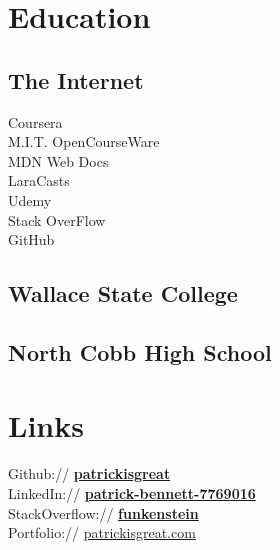 \documentclass[]{pb-resume-openfonts}
\begin{document}
%
%
\lastupdated

%
%

%
%

\begin{minipage}[t]{0.33\textwidth} 


\section{Education} 

\subsection{The Internet}
Coursera \\
M.I.T. OpenCourseWare \\
MDN Web Docs \\
LaraCasts \\
Udemy \\
Stack OverFlow \\
GitHub \\

\sectionsep

\subsection{Wallace State College}
\sectionsep

\subsection{North Cobb High School}
\sectionsep


\section{Links} 
Github:// \href{https://github.com/patrickisgreat}{\bf patrickisgreat} \\
LinkedIn://  \href{https://www.linkedin.com/in/patrick-bennett-7769016}{\bf patrick-bennett-7769016} \\
StackOverflow:// \href{https://stackoverflow.com/users/864159/funkenstein}{\bf funkenstein} \\
Portfolio:// \href{https://patrickisgreat.com/}{patrickisgreat.com} \\



\end{minipage}
\end{document}
